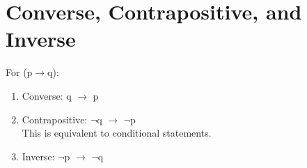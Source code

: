 \documentclass{article}
\begin{document}
\section{Converse, Contrapositive, and Inverse}
For (p$\to$q):
\begin{enumerate}
    \item
    Converse: q $\to$ p

    \item
    Contrapositive: $\neg$q $\to$ $\neg$p\\This is equivalent to conditional statements.

    \item
    Inverse: $\neg$p $\to$ $\neg$q
\end{enumerate}
\end{document}
